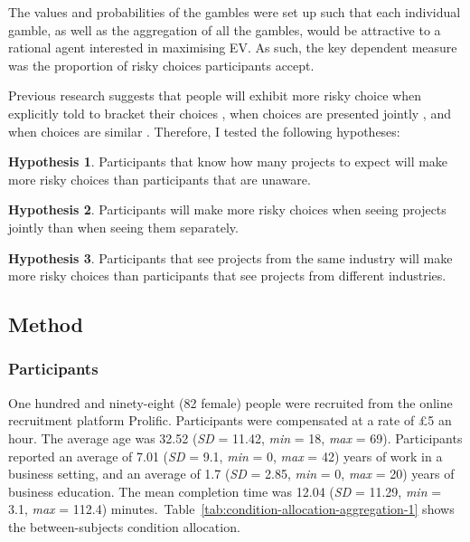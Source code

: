 \documentclass[a4paper, nobind, dvipsnames]{templates/ociamthesis}
\theoremstyle{definition}
\theoremstyle{definition}
\theoremstyle{definition}
\theoremstyle{definition}
\newtheorem{hypothesis}{Hypothesis}[chapter]
\theoremstyle{remark}
\begin{document}
The values and probabilities of the gambles were set up such that each
individual gamble, as well as the aggregation of all the gambles, would be
attractive to a rational agent interested in maximising EV. As such, the key
dependent measure was the proportion of risky choices participants accept.

Previous research suggests that people will exhibit more risky choice when
explicitly told to bracket their choices \autocite{sokolhessner2009,sokolhessner2012},
when choices are presented jointly \autocites[e.g.,][]{moher2010,hsee1999}, and when
choices are similar \autocites[e.g.,][]{dekay2005,markman1995}. Therefore, I tested the
following hypotheses:

\begin{hypothesis}
\protect\hypertarget{hyp:awareness-aggregation-1}{}{\label{hyp:awareness-aggregation-1} }Participants that know how many projects to expect will make more risky choices
than participants that are unaware.
\end{hypothesis}

\begin{hypothesis}
\protect\hypertarget{hyp:presentation-aggregation-1}{}{\label{hyp:presentation-aggregation-1} }Participants will make more risky choices when seeing projects jointly than when
seeing them separately.
\end{hypothesis}

\begin{hypothesis}
\protect\hypertarget{hyp:similarity-aggregation-1}{}{\label{hyp:similarity-aggregation-1} }Participants that see projects from the same industry will make more risky
choices than participants that see projects from different industries.
\end{hypothesis}

\subsection{Method}

\subsubsection{Participants}

One hundred and ninety-eight (82 female) people were recruited from the online recruitment platform Prolific. Participants were compensated at a rate of £5 an hour. The average age was 32.52 (\emph{SD} = 11.42, \emph{min} = 18, \emph{max} = 69). Participants reported an average of 7.01 (\emph{SD} = 9.1, \emph{min} = 0, \emph{max} = 42) years of work in a business setting, and an average of 1.7 (\emph{SD} = 2.85, \emph{min} = 0, \emph{max} = 20) years of business education. The mean completion time was 12.04 (\emph{SD} = 11.29, \emph{min} = 3.1, \emph{max} = 112.4) minutes.~Table~\ref{tab:condition-allocation-aggregation-1}
shows the between-subjects condition allocation.
\end{document}
